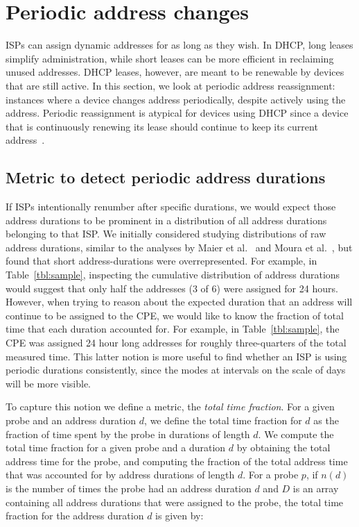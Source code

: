 
\section{Periodic address changes}
\label{sec:periodic}

ISPs can assign dynamic addresses for as long as they wish.
In DHCP, long leases simplify administration, while short
leases can be more efficient in reclaiming unused addresses.
DHCP leases, however, are meant to be renewable by devices
that are still active.  In this section, we look at periodic
address reassignment: instances where a device changes
address periodically, despite actively using the address. Periodic
reassignment is atypical for devices using DHCP since a
device that is continuously renewing its lease should continue to
keep its current address~\cite{rfc2131}.

\subsection{Metric to detect periodic address durations}

If ISPs intentionally renumber after specific durations, we would
expect those address durations to be prominent in a distribution
of all address durations belonging to that ISP. We initially
considered studying distributions
of raw address durations, similar to the analyses by
Maier et al.~\cite{maier2009dominant} and
Moura et al.~\cite{zmap-dhcp}, but found that short address-durations
were overrepresented. For example, in Table~\ref{tbl:sample},
inspecting the cumulative distribution of address
durations
would suggest that only half the addresses (3 of 6) were assigned for 24
hours. However, 
when trying to reason about the expected duration that an address will
continue to be assigned to the CPE, we would like to know the fraction
of total time that each duration accounted for. For example, in
Table~\ref{tbl:sample}, the CPE was assigned
24 hour long addresses for roughly three-quarters of the total
measured time. This latter notion is more useful to find whether an
ISP is using periodic durations consistently, since the modes at
intervals on the scale of days will be more visible. 

To capture this notion we
define a metric, the \emph{total time fraction}. 
For a given probe and an address duration $d$,
we define the total time fraction for $d$ as the fraction of time
spent by the probe in durations of length $d$. We compute the total time fraction for a given probe and a duration
$d$ by obtaining the total address
time for the probe, and computing the fraction of the total
address time that was accounted for by address durations of 
length $d$. For a probe $p$, if $n(d)$ is the number of times the probe had an address duration
$d$ and $D$ is an array containing all address durations that were assigned to
the probe, the total time fraction for the address duration $d$ is
given by:

